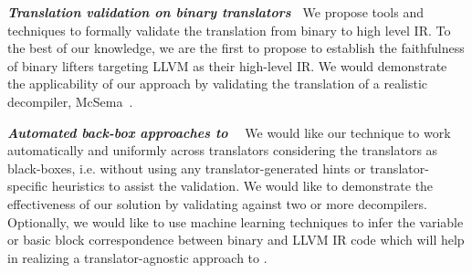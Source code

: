 \textbf{\emph{Translation validation on binary translators~}} We propose tools
and techniques to formally validate the translation from binary to high level
IR.  To the best of our knowledge, we are the first to propose \tv to establish
the faithfulness of binary lifters targeting LLVM as their high-level IR. We
would demonstrate the applicability of our approach by validating the
translation of a realistic decompiler, McSema~\cite{McSema:Recon14}.

\textbf{\emph{Automated back-box approaches to \tv~}} We would like our
technique to work automatically and uniformly across translators considering
the translators as black-boxes, i.e. without using any translator-generated
hints  or translator-specific heuristics to assist the validation. We would
like to demonstrate the effectiveness  of our solution by validating against
two or more decompilers.  Optionally, we would like to use machine learning
techniques to infer the  variable or basic block correspondence between binary
and LLVM IR code which will help in realizing a translator-agnostic approach to
\tv.



